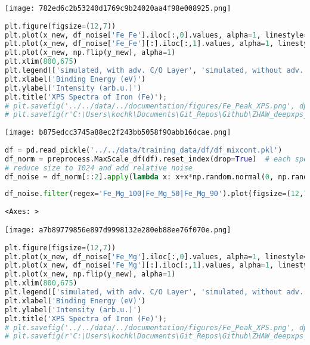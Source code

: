 \texttt{[image: 782ed6c2b53240d1769c9b24020aa4f98e008925.png]}

\begin{lstlisting}[language=Python]
plt.figure(figsize=(12,7))
plt.plot(x_new, df_noise['Fe_Fe'].iloc[:,0].values, alpha=1, linestyle='dashed')
plt.plot(x_new, df_noise['Fe_Fe'][:].iloc[:,1].values, alpha=1, linestyle='dashed')
plt.plot(x_new, np.flip(y_new), alpha=1)
plt.xlim(800,675)
plt.legend(['simulated, with adv. C/O Layer', 'simulated, without adv. C/O Layer', 'experimental, ion-etched'])
plt.xlabel('Binding Energy (eV)')
plt.ylabel('Intensity (arb.u.)')
plt.title('XPS Spectra of Iron (Fe)');
# plt.savefig('../../data/../documentation/figures/Fe_Peak_XPS.png', dpi=300)
# plt.savefig(r'C:\Users\kochk\Documents\Git_Repos\Github\ZHAW_deepxps_thesis\Figures\Fe_Peak_XPS.png', dpi=300)
\end{lstlisting}

\texttt{[image: b875edcc3745a88ec2f243bb5058f90abb16dcae.png]}

\begin{lstlisting}[language=Python]
df = pd.read_pickle('../../data/training_data/df/df_mixcont.pkl') 
df_norm = preprocess.MaxScale_df(df).reset_index(drop=True)  # each spectrum is scaled to 1
# reduce size to 1024 and add relative noise
df_noise = df_norm[::2].apply(lambda x: x+x*np.random.normal(0, np.random.randint(1,3)*0.01 , len(x)))
\end{lstlisting}

\begin{lstlisting}[language=Python]
df_noise.filter(regex='Fe_Mg_100|Fe_Mg_50|Fe_Mg_90').plot(figsize=(12,7))
\end{lstlisting}

\begin{lstlisting}
<Axes: >
\end{lstlisting}

\texttt{[image: a7b89779856e897d9998132e280eb88ee76f070e.png]}

\begin{lstlisting}[language=Python]
plt.figure(figsize=(12,7))
plt.plot(x_new, df_noise['Fe_Mg'].iloc[:,0].values, alpha=1, linestyle='dashed')
plt.plot(x_new, df_noise['Fe_Mg'][:].iloc[:,1].values, alpha=1, linestyle='dashed')
plt.plot(x_new, np.flip(y_new), alpha=1)
plt.xlim(800,675)
plt.legend(['simulated, with adv. C/O Layer', 'simulated, without adv. C/O Layer', 'experimental, ion-etched'])
plt.xlabel('Binding Energy (eV)')
plt.ylabel('Intensity (arb.u.)')
plt.title('XPS Spectra of Iron (Fe)');
# plt.savefig('../../data/../documentation/figures/Fe_Peak_XPS.png', dpi=300)
# plt.savefig(r'C:\Users\kochk\Documents\Git_Repos\Github\ZHAW_deepxps_thesis\Figures\Fe_Peak_XPS.png', dpi=300)
\end{lstlisting}

